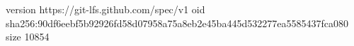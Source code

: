 version https://git-lfs.github.com/spec/v1
oid sha256:90df6eebf5b92926fd58d07958a75a8eb2e45ba445d532277ea5585437fca080
size 10854
